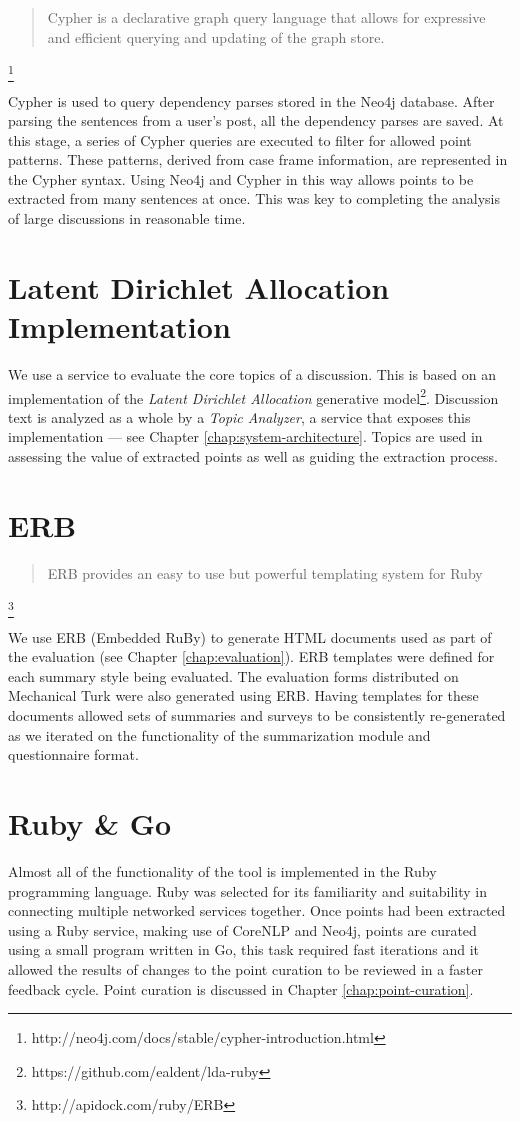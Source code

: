     \blockquote{Cypher is a declarative graph query language that allows for expressive and efficient querying and updating of the graph store.}\footnote{http://neo4j.com/docs/stable/cypher-introduction.html}

    Cypher is used to query dependency parses stored in the Neo4j database. After parsing the sentences from a user's post, all the dependency parses are saved. At this stage, a series of Cypher queries are executed to filter for allowed point patterns. These patterns, derived from case frame information, are represented in the Cypher syntax. Using Neo4j and Cypher in this way allows points to be extracted from many sentences at once. This was key to completing the analysis of large discussions in reasonable time.

  \tocless\section{Latent Dirichlet Allocation Implementation\label{sec:lda-tech}}
    We use a service to evaluate the core topics of a discussion. This is based on an implementation of the \textit{Latent Dirichlet Allocation} generative model\footnote{https://github.com/ealdent/lda-ruby}. Discussion text is analyzed as a whole by a \textit{Topic Analyzer}, a service that exposes this implementation --- see Chapter \ref{chap:system-architecture}. Topics are used in assessing the value of extracted points as well as guiding the extraction process.

  \tocless\section{ERB}
    \blockquote{ERB provides an easy to use but powerful templating system for Ruby}\footnote{http://apidock.com/ruby/ERB}

    We use ERB (Embedded RuBy) to generate HTML documents used as part of the evaluation (see Chapter \ref{chap:evaluation}). ERB templates were defined for each summary style being evaluated. The evaluation forms distributed on Mechanical Turk were also generated using ERB. Having templates for these documents allowed sets of summaries and surveys to be consistently re-generated as we iterated on the functionality of the summarization module and questionnaire format.

  \tocless\section{Ruby \& Go}
    Almost all of the functionality of the tool is implemented in the Ruby programming language. Ruby was selected for its familiarity and suitability in connecting multiple networked services together. Once points had been extracted using a Ruby service, making use of CoreNLP and Neo4j, points are curated using a small program written in Go, this task required fast iterations and it allowed the results of changes to the point curation to be reviewed in a faster feedback cycle. Point curation is discussed in Chapter \ref{chap:point-curation}.

